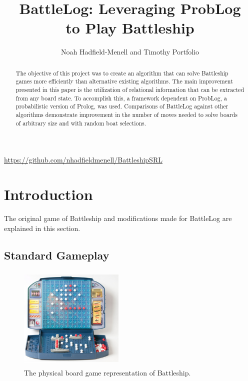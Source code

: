 \documentclass[]{article}
\title{BattleLog: Leveraging ProbLog\\
	to Play Battleship}
\author{Noah Hadfield-Menell and Timothy Portfolio}
\date{\vspace{-5ex}}
\begin{document}
\maketitle
\begin{center}
	\url{https://github.com/nhadfieldmenell/BattleshipSRL}
\end{center}

\begin{abstract}
	
The objective of this project was to create an algorithm that can solve Battleship games more efficiently than alternative existing algorithms. The main improvement presented in this paper is the utilization of relational information that can be extracted from any board state. To accomplish this, a framework dependent on ProbLog, a probabilistic version of Prolog, was used. Comparisons of BattleLog against other algorithms demonstrate improvement in the number of moves needed to solve boards of arbitrary size and with random boat selections. 
	
\end{abstract}

\section{Introduction}

The original game of Battleship and modifications made for BattleLog are explained in this section. 

\subsection{Standard Gameplay}
\vspace{-2ex}
\begin{figure}
	\includegraphics[width=5cm, height=5cm]{battleship}
	\captionsetup{justification=centering,margin=0.25cm}
	\caption{The physical board game representation of Battleship.}
\end{figure}
\end{document}
